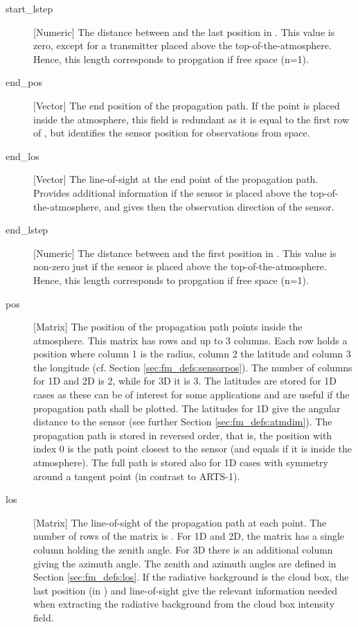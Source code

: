 \begin{description}
   \item[start\_lstep] [Numeric] The distance between 
     and the last position in . This value is zero, except for a
     transmitter placed above the top-of-the-atmosphere. Hence, this length
     corresponds to propgation if free space (n=1).

   \item[end\_pos] [Vector] The end position of the propagation path. If
     the point is placed inside the atmosphere, this field is redundant as it
     is equal to the first row of , but identifies the sensor
     position for observations from space.

   \item[end\_los] [Vector] The line-of-sight at the end point of the
     propagation path. Provides additional information if the sensor is placed
     above the top-of-the-atmosphere, and gives then the observation direction
     of the sensor.

   \item[end\_lstep] [Numeric] The distance between 
     and the first position in . This value is non-zero just if
     the sensor is placed above the top-of-the-atmosphere. Hence, this length
     corresponds to propgation if free space (n=1).

   \item[pos] [Matrix] The position of the propagation path points inside the
     atmosphere. This matrix has  rows and up to 3 columns. Each
     row holds a position where column 1 is the radius, column 2 the latitude
     and column 3 the longitude (cf. Section \ref{sec:fm_defs:sensorpos}). The
     number of columns for 1D and 2D is 2, while for 3D it is 3. The latitudes
     are stored for 1D cases as these can be of interest for some applications
     and are useful if the propagation path shall be plotted. The latitudes for
     1D give the angular distance to the sensor (see further Section
     \ref{sec:fm_defs:atmdim}). The propagation path is stored in reversed
     order, that is, the position with index 0 is the path point closest to the
     sensor (and equals  if it is inside the atmosphere).
     The full path is stored also for 1D cases with symmetry around a tangent
     point (in contrast to ARTS-1).
     
   \item[los] [Matrix] The line-of-sight of the propagation path at
     each point. The number of rows of the matrix is .
     For 1D and 2D, the matrix has a single column holding the zenith
     angle. For 3D there is an additional column giving the azimuth
     angle. The zenith and azimuth angles are defined in
     Section \ref{sec:fm_defs:los}. If the radiative background is the
     cloud box, the last position (in ) and
     line-of-sight give the relevant information needed when
     extracting the radiative background from the cloud box intensity
     field.
     

\end{description}
